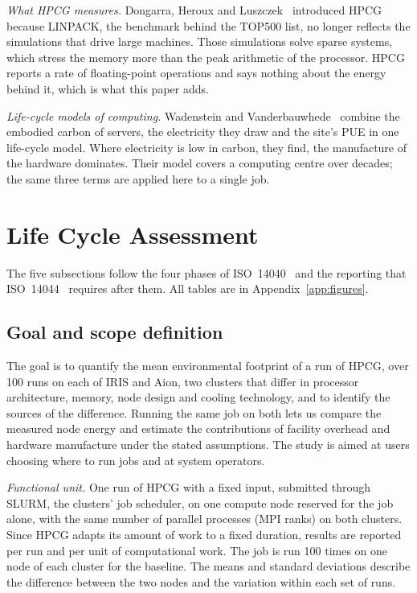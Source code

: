 \documentclass[conference,a4paper]{IEEEtran}
\begin{document}
\emph{What HPCG measures.} Dongarra, Heroux and Luszczek~\cite{dongarra2016}
introduced HPCG because LINPACK, the benchmark behind the TOP500 list, no longer
reflects the simulations that drive large machines. Those simulations solve
sparse systems, which stress the memory more than the peak arithmetic of the
processor. HPCG reports a rate of floating-point operations and says nothing
about the energy behind it, which is what this paper adds.

\emph{Life-cycle models of computing.} Wadenstein and
Vanderbauwhede~\cite{wadenstein2025} combine the embodied carbon of servers, the
electricity they draw and the site's PUE in one life-cycle model. Where
electricity is low in carbon, they find, the manufacture of the hardware
dominates. Their model covers a computing centre over decades; the same three
terms are applied here to a single job.

\section{Life Cycle Assessment}

The five subsections follow the four phases of ISO~14040~\cite{iso14040} and the
reporting that ISO~14044~\cite{iso14044} requires after them. All tables are in
Appendix~\ref{app:figures}.

\subsection{Goal and scope definition}\label{sec:goalscope}

The goal is to quantify the mean environmental footprint of a run of HPCG,
over 100 runs on each of IRIS and Aion, two clusters that differ in processor
architecture, memory, node design and cooling technology, and to identify the
sources of the difference. Running the same job on both lets us compare the
measured node energy and estimate the contributions of facility overhead and
hardware manufacture under the stated assumptions. The study is aimed at users choosing where
to run jobs and at system operators.

\emph{Functional unit.} One run of HPCG with a fixed input, submitted through
SLURM, the clusters' job scheduler, on one compute node reserved for the job
alone, with the same number of parallel processes (MPI ranks) on both clusters.
Since HPCG adapts its amount of work to a fixed duration, results are reported
per run and per unit of computational work. The job is run 100 times on one node
of each cluster for the baseline. The means and standard deviations describe
the difference between the two nodes and the variation within each set of runs.
\end{document}
